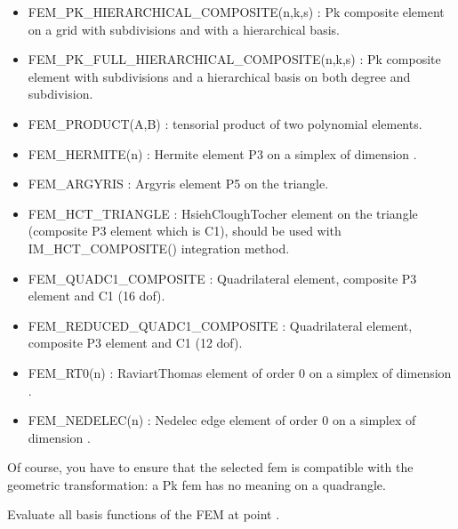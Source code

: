 \documentclass[a4paper,11pt,english]{sphinxmanual}
\begin{document}
\begin{fulllineitems}
\begin{itemize}
\begin{itemize}
\item {} 
FEM\_PK\_HIERARCHICAL\_COMPOSITE(n,k,s) :
Pk composite element on a grid with  subdivisions and with a
hierarchical basis.

\item {} 
FEM\_PK\_FULL\_HIERARCHICAL\_COMPOSITE(n,k,s) :
Pk composite element with  subdivisions and a hierarchical basis
on both degree and subdivision.

\item {} 
FEM\_PRODUCT(A,B) :
tensorial product of two polynomial elements.

\item {} 
FEM\_HERMITE(n) :
Hermite element P3 on a simplex of dimension .

\item {} 
FEM\_ARGYRIS :
Argyris element P5 on the triangle.

\item {} 
FEM\_HCT\_TRIANGLE :
Hsieh\sphinxhyphen{}Clough\sphinxhyphen{}Tocher element on the triangle (composite P3 element
which is C1), should be used with IM\_HCT\_COMPOSITE() integration
method.

\item {} 
FEM\_QUADC1\_COMPOSITE :
Quadrilateral element, composite P3 element and C1 (16 dof).

\item {} 
FEM\_REDUCED\_QUADC1\_COMPOSITE :
Quadrilateral element, composite P3 element and C1 (12 dof).

\item {} 
FEM\_RT0(n) :
Raviart\sphinxhyphen{}Thomas element of order 0 on a simplex of dimension .

\item {} 
FEM\_NEDELEC(n) :
Nedelec edge element of order 0 on a simplex of dimension .

\end{itemize}

Of course, you have to ensure that the selected fem is compatible with
the geometric transformation: a Pk fem has no meaning on a quadrangle.

\end{itemize}

\begin{fulllineitems}
\label{\detokenize{python/cmdref_Fem:getfem.Fem.base_value}}
Evaluate all basis functions of the FEM at point .


\end{fulllineitems}
\end{fulllineitems}
\end{document}
